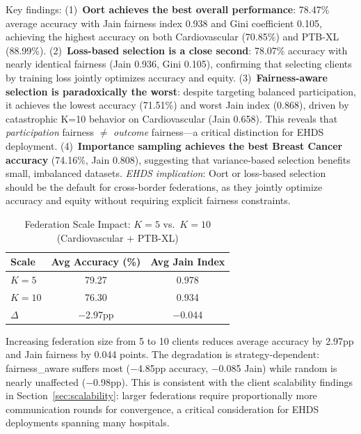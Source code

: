 \documentclass[conference]{IEEEtran}
\begin{document}
\begin{table}[htbp]
\vspace{1mm}
\footnotesize{Key findings: (1)~\textbf{Oort achieves the best overall performance}: 78.47\% average accuracy with Jain fairness index 0.938 and Gini coefficient 0.105, achieving the highest accuracy on both Cardiovascular (70.85\%) and PTB-XL (88.99\%). (2)~\textbf{Loss-based selection is a close second}: 78.07\% accuracy with nearly identical fairness (Jain 0.936, Gini 0.105), confirming that selecting clients by training loss jointly optimizes accuracy and equity. (3)~\textbf{Fairness-aware selection is paradoxically the worst}: despite targeting balanced participation, it achieves the lowest accuracy (71.51\%) and worst Jain index (0.868), driven by catastrophic K=10 behavior on Cardiovascular (Jain 0.658). This reveals that \textit{participation} fairness $\neq$ \textit{outcome} fairness---a critical distinction for EHDS deployment. (4)~\textbf{Importance sampling achieves the best Breast Cancer accuracy} (74.16\%, Jain 0.808), suggesting that variance-based selection benefits small, imbalanced datasets. \textit{EHDS implication}: Oort or loss-based selection should be the default for cross-border federations, as they jointly optimize accuracy and equity without requiring explicit fairness constraints.}
\end{table}

\begin{table}[htbp]
\centering
\caption{Federation Scale Impact: $K{=}5$ vs.\ $K{=}10$ (Cardiovascular + PTB-XL)}
\label{tab:scale_comparison}
\begin{tabular}{lcc}
\toprule
Scale & Avg Accuracy (\%) & Avg Jain Index \\
\midrule
$K{=}5$ & 79.27 & 0.978 \\
$K{=}10$ & 76.30 & 0.934 \\
\midrule
$\Delta$ & $-$2.97pp & $-$0.044 \\
\bottomrule
\end{tabular}

\vspace{1mm}
\footnotesize{Increasing federation size from 5 to 10 clients reduces average accuracy by 2.97pp and Jain fairness by 0.044 points. The degradation is strategy-dependent: fairness\_aware suffers most ($-$4.85pp accuracy, $-$0.085 Jain) while random is nearly unaffected ($-$0.98pp). This is consistent with the client scalability findings in Section~\ref{sec:scalability}: larger federations require proportionally more communication rounds for convergence, a critical consideration for EHDS deployments spanning many hospitals.}
\end{table}
\end{document}
